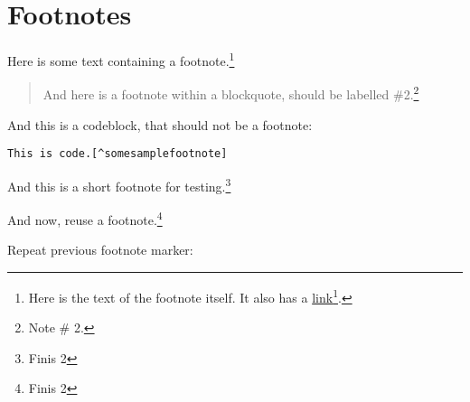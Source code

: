 
\def\mytitle{MultiMarkdown Footer Test}


\part{Footnotes}
\label{footnotes}

Here is some text containing a footnote.\footnote{Here is the text of the footnote itself. It also has a \href{http://somelink.com}{link}\footnote{\href{http://somelink.com}{http:/\slash somelink.com}}.}

\begin{quote}

And here is a footnote within a blockquote, should be labelled \#2.\footnote{Note \# 2.}
\end{quote}

And this is a codeblock, that should not be a footnote:

\begin{verbatim}
This is code.[^somesamplefootnote]
\end{verbatim}

And this is a short footnote for testing.\footnote{Finis 2}

And now, reuse a footnote.\footnote{Finis 2}

Repeat previous footnote marker:




